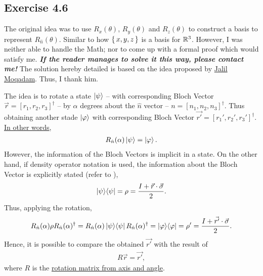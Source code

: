 \subsection{Exercise 4.6}
The original idea was to use $R_x(\theta)$, $R_y(\theta)$ and $R_z(\theta)$
to construct a basis to represent $R_{\hat n}(\theta)$.
Similar to how $\set{x, y, z}$ is a basis for $\mathbb{R}^3$.
However, I was neither able to handle the Math;
nor to come up with a formal proof which would satisfy me.
\emph{\textbf{If the reader manages to solve it this way, please contact me!}}
The solution hereby detailed is based on the idea proposed by
\href{https://scholar.google.com.br/citations?user=AzhOiFAAAAAJ&hl}
{Jalil Moqadam}. Thus, I thank him.

The idea is to rotate a state $\ket\psi$ --
with corresponding Bloch Vector $\vec{r} = [r_1, r_2, r_3]^\dagger$ --
by $\alpha$ degrees about the $\hat n$ vector --
$n = [n_1, n_2, n_3]^\dagger$.
Thus obtaining another stade $\ket \varphi$ with corresponding
Bloch Vector $\vec{r'} = [r_1', r_2', r_3']^\dagger$.
\href{https://www.youtube.com/watch?v=DtL_giO-EB8#t=4m3.5s}{In other words},
\begin{align}
    R_{\hat n}(\alpha) \ket \psi = \ket \varphi .
\end{align}
However, the information of the Bloch Vectors is implicit in a state.
On the other hand, if density operator notation is used,
the information about the Bloch Vector is explicitly stated
(refer to ),
\begin{align}
    \mathop{\mathinner{ |{\psi}\rangle \langle{\psi}|}} = \rho = \frac{I + \vec{r} \cdot \vec{\sigma}}{2}.
\end{align}
Thus, applying the rotation,
\begin{align}
    R_{\hat n}(\alpha) \rho R_{\hat n}(\alpha)^\dagger =
    R_{\hat n}(\alpha) \mathop{\mathinner{ |{\psi}\rangle \langle{\psi}|}} R_{\hat n}(\alpha)^\dagger =
    \mathop{\mathinner{ |{\varphi}\rangle \langle{\varphi}|}}  =
    \rho' =
    \frac{I + \vec{r'}\cdot\vec{\sigma}}{2} .
\end{align}
Hence, it is possible to compare the obtained $\vec{r'}$ with
the result of
\begin{align}
    R \vec r = \vec{r'},
    \label{eq:nielsen-and-chuang-exercise-4-6-assert}
\end{align}
where $R$ is the
\href{https://en.wikipedia.org/wiki/Rotation_matrix#Rotation_matrix_from_axis_and_angle}
{rotation matrix from axis and angle}.

